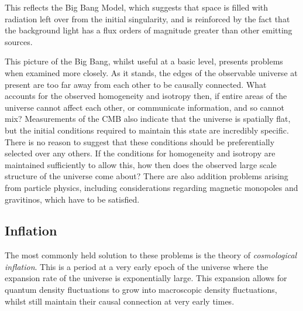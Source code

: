 This reflects the Big Bang Model, which suggests that space is filled with radiation left over from the initial singularity, and is reinforced by the fact that the background light has a flux orders of magnitude greater than other emitting sources.
\par This picture of the Big Bang, whilst useful at a basic level, presents problems when examined more closely. As it stands, the edges of the observable universe at present are too far away from each other to be causally connected. What accounts for the observed homogeneity and isotropy then, if entire areas of the universe cannot affect each other, or communicate information, and so cannot mix? Measurements of the CMB also indicate that the universe is spatially flat, but the initial conditions required to maintain this state are incredibly specific. There is no reason to suggest that these conditions should be preferentially selected over any others. If the conditions for homogeneity and isotropy are maintained sufficiently to allow this, how then does the observed large scale structure of the universe come about? There are also addition problems arising from particle physics, including considerations regarding magnetic monopoles and gravitinos, which have to be satisfied.

\subsection{Inflation}
The most commonly held solution to these problems is the theory of \emph{cosmological inflation}\cite{Linde:07}. This is a period at a very early epoch of the universe where the expansion rate of the universe is exponentially large. This expansion allows for quantum density fluctuations to grow into macroscopic density fluctuations, whilst still maintain their causal connection at very early times. 